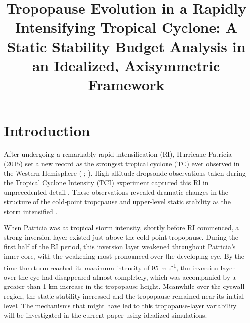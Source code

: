 \documentclass{ametsoc}
\title{Tropopause Evolution in a Rapidly Intensifying Tropical Cyclone: A Static Stability Budget Analysis in an Idealized, Axisymmetric Framework}
\affiliation{University at Albany, State University of New York,
Albany, NY}
\begin{document}
\maketitle


%

 \section{Introduction}


After undergoing a remarkably rapid intensification (RI), Hurricane Patricia (2015) set a new record as the strongest tropical cyclone (TC) ever observed in the Western Hemisphere (\citeauthor{Kimberlainetal2016} \citeyear{Kimberlainetal2016}; \citeauthor{Rogersetal2017} \citeyear{Rogersetal2017}).
High-altitude dropsonde observations taken during the Tropical Cyclone Intensity (TCI) experiment captured this RI in unprecedented detail \citep{DoyleTCI}.
These observations revealed dramatic changes in the structure of the cold-point tropopause and upper-level static stability as the storm intensified \citep{DuranMolinari2018}.

When Patricia was at tropical storm intensity, shortly before RI commenced, a strong inversion layer existed just above the cold-point tropopause.
During the first half of the RI period, this inversion layer weakened throughout Patricia's inner core, with the weakening most pronounced over the developing eye.
By the time the storm reached its maximum intensity of 95 m s\textsuperscript{-1}, the inversion layer over the eye had disappeared almost completely, which was accompanied by a greater than 1-km increase in the tropopause height.
Meanwhile over the eyewall region, the static stability increased and the tropopause remained near its initial level.
The mechanisms that might have led to this tropopause-layer variability will be investigated in the current paper using idealized simulations.
\end{document}
